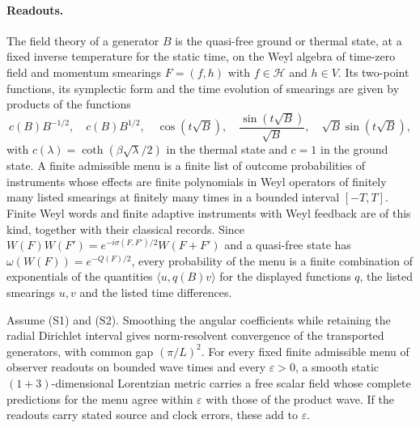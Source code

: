 \documentclass[11pt]{article}
\begin{document}
\paragraph{Readouts.}
The field theory of a generator $B$ is the quasi-free ground or thermal
state, at a fixed inverse temperature for the static time, on the Weyl
algebra of time-zero field and momentum smearings $F=(f,h)$ with
$f\in\mathcal H$ and $h\in V$. Its two-point functions, its symplectic form
and the time evolution of smearings are given by products of the functions
\[
 c(B)B^{-1/2},\quad c(B)B^{1/2},\quad \cos(t\sqrt B),\quad
 \frac{\sin(t\sqrt B)}{\sqrt B},\quad \sqrt B\sin(t\sqrt B),
\]
with $c(\lambda)=\coth(\beta\sqrt\lambda/2)$ in the thermal state and
$c=1$ in the ground state. A finite admissible menu is a finite list of
outcome probabilities of instruments whose effects are finite polynomials in
Weyl operators of finitely many listed smearings at finitely many times in
a bounded interval $[-T,T]$. Finite Weyl words and finite adaptive
instruments with Weyl feedback are of this kind, together with their
classical records. Since $W(F)W(F')=e^{-i\sigma(F,F')/2}W(F+F')$ and a
quasi-free state has $\omega(W(F))=e^{-Q(F)/2}$, every probability of the
menu is a finite combination of exponentials of the quantities
$\langle u,q(B)v\rangle$ for the displayed functions $q$, the listed
smearings $u,v$ and the listed time differences.

\begin{proposition}
\label{prop:smooth-effective-descriptions}
Assume (S1) and (S2). Smoothing the angular coefficients while retaining the
radial Dirichlet interval gives norm-resolvent convergence of the transported
generators, with common gap $(\pi/L)^2$. For every fixed finite admissible
menu of observer readouts on bounded wave times and every
$\varepsilon>0$, a smooth static $(1+3)$-dimensional Lorentzian metric carries
a free scalar field whose complete predictions for the menu agree within
$\varepsilon$ with those of the product wave. If the readouts carry stated
source and clock errors, these add to $\varepsilon$.
\end{proposition}
\end{document}
